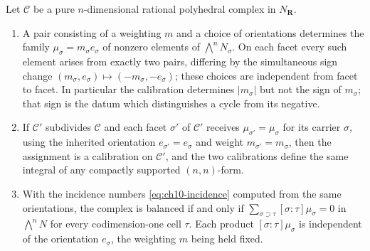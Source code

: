\begin{proposition}
\label{prop:ch10-calibration-basics}
Let $\mathscr C$ be a pure $n$-dimensional rational polyhedral complex in
$N_{\mathbf R}$.
\begin{enumerate}
\item\label{itm:ch10-cal-bijection} A pair consisting of a weighting $m$ and
      a choice of orientations determines the family
      $\mu_\sigma=m_\sigma e_\sigma$ of nonzero elements of
      $\bigwedge^nN_\sigma$.  On each facet every such element arises from
      exactly two pairs, differing by the simultaneous sign change
      $(m_\sigma,e_\sigma)\mapsto(-m_\sigma,-e_\sigma)$; these choices are
      independent from facet to facet.  In particular the calibration
      determines $|m_\sigma|$ but not the sign of $m_\sigma$; that sign is
      the datum which distinguishes a cycle from its negative.
\item\label{itm:ch10-cal-subdivision} If $\mathscr C'$ subdivides
      $\mathscr C$ and each facet $\sigma'$ of $\mathscr C'$ receives
      $\mu_{\sigma'}=\mu_\sigma$ for its carrier $\sigma$, using the
      inherited orientation $e_{\sigma'}=e_\sigma$ and weight
      $m_{\sigma'}=m_\sigma$, then the
      assignment is a calibration on $\mathscr C'$, and the two calibrations
      define the same integral of any compactly supported $(n,n)$-form.
\item\label{itm:ch10-cal-balancing} With the incidence numbers
      \eqref{eq:ch10-incidence} computed from the same orientations, the
      complex is balanced if and only if
      $\sum_{\sigma\supset\tau}[\sigma:\tau]\mu_\sigma=0$ in
      $\bigwedge^nN$ for every codimension-one cell $\tau$.  Each product
      $[\sigma:\tau]\mu_\sigma$ is independent of the orientation
      $e_\sigma$, the weighting $m$ being held fixed.
\end{enumerate}
\end{proposition}

